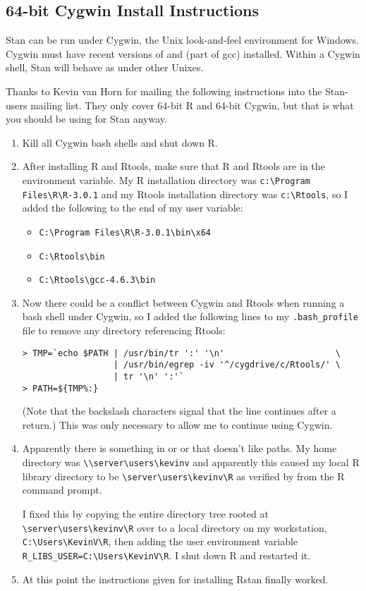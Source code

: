 \subsection{64-bit Cygwin Install Instructions}\label{cygwin.section}

Stan can be run under Cygwin, the Unix look-and-feel environment for
Windows.  Cygwin must have recent versions of  and
 (part of gcc) installed.  Within a Cygwin shell, Stan
will behave as under other Unixes.

Thanks to Kevin van Horn for mailing the following instructions into
the Stan-users mailing list.  They only cover 64-bit R and 64-bit
Cygwin, but that is what you should be using for Stan anyway.

\begin{enumerate}
\item Kill all Cygwin bash shells and shut down R.
\item After installing R and Rtools, make sure that R and Rtools are
  in the  environment variable. My R installation directory was
  \verb|c:\Program Files\R\R-3.0.1| and my Rtools installation
  directory was \verb|c:\Rtools|, so I added the following to the end
  of my user  variable:
  \begin{itemize}
  \item \verb|C:\Program Files\R\R-3.0.1\bin\x64|
  \item \verb|C:\Rtools\bin|
  \item \verb|C:\Rtools\gcc-4.6.3\bin|
  \end{itemize}
\item Now there could be a conflict between Cygwin and Rtools when
  running a bash shell under Cygwin, so I added the following lines to
  my \verb|.bash_profile| file to remove any  directory
  referencing Rtools:
  \begin{Verbatim}
> TMP=`echo $PATH | /usr/bin/tr ':' '\n'                      \
                  | /usr/bin/egrep -iv '^/cygdrive/c/Rtools/' \
                  | tr '\n' ':'`
> PATH=${TMP%:}
\end{Verbatim}
(Note that the backslash characters signal that the line continues
after a return.)  This was only necessary to allow me to continue
using Cygwin.
\item Apparently there is something in \code{Rcpp} or  or
  \code{rstan} that doesn't like  paths. My home directory
  was \verb|\\server\users\kevinv| and apparently this caused my
  local R library directory to be \verb|\server\users\kevinv\R|
  as verified by \code{.libPaths()} from the R command prompt. 

  I fixed this by copying the entire directory tree rooted at
  \verb|\server\users\kevinv\R| over to a local directory on my workstation,
  \verb|C:\Users\KevinV\R|, then adding the user environment variable
  \verb|R_LIBS_USER=C:\Users\KevinV\R|. I shut down R and restarted it.
\item At this point the instructions given for installing Rstan
  finally worked.
\end{enumerate}


